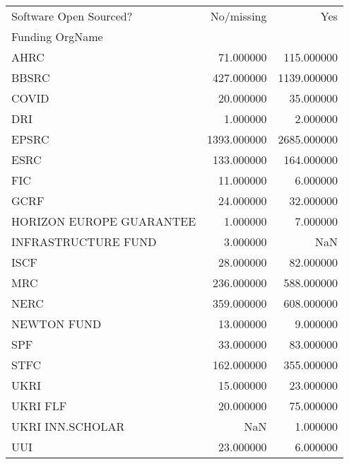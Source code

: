\begin{tabular}{lrr}
\toprule
Software Open Sourced? & No/missing & Yes \\
Funding OrgName &  &  \\
\midrule
AHRC & 71.000000 & 115.000000 \\
BBSRC & 427.000000 & 1139.000000 \\
COVID & 20.000000 & 35.000000 \\
DRI & 1.000000 & 2.000000 \\
EPSRC & 1393.000000 & 2685.000000 \\
ESRC & 133.000000 & 164.000000 \\
FIC & 11.000000 & 6.000000 \\
GCRF & 24.000000 & 32.000000 \\
HORIZON EUROPE GUARANTEE & 1.000000 & 7.000000 \\
INFRASTRUCTURE FUND & 3.000000 & NaN \\
ISCF & 28.000000 & 82.000000 \\
MRC & 236.000000 & 588.000000 \\
NERC & 359.000000 & 608.000000 \\
NEWTON FUND & 13.000000 & 9.000000 \\
SPF & 33.000000 & 83.000000 \\
STFC & 162.000000 & 355.000000 \\
UKRI & 15.000000 & 23.000000 \\
UKRI FLF & 20.000000 & 75.000000 \\
UKRI INN.SCHOLAR & NaN & 1.000000 \\
UUI & 23.000000 & 6.000000 \\
\bottomrule
\end{tabular}
